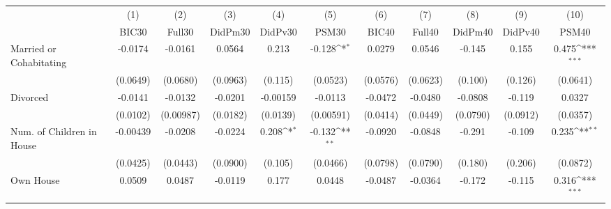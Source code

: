 {
\def\sym#1{\ifmmode^{#1}\else\(^{#1}\)\fi}
\begin{tabular}{l*{10}{c}}
\toprule
            &\multicolumn{1}{c}{(1)}&\multicolumn{1}{c}{(2)}&\multicolumn{1}{c}{(3)}&\multicolumn{1}{c}{(4)}&\multicolumn{1}{c}{(5)}&\multicolumn{1}{c}{(6)}&\multicolumn{1}{c}{(7)}&\multicolumn{1}{c}{(8)}&\multicolumn{1}{c}{(9)}&\multicolumn{1}{c}{(10)}\\
            &\multicolumn{1}{c}{BIC30}&\multicolumn{1}{c}{Full30}&\multicolumn{1}{c}{DidPm30}&\multicolumn{1}{c}{DidPv30}&\multicolumn{1}{c}{PSM30}&\multicolumn{1}{c}{BIC40}&\multicolumn{1}{c}{Full40}&\multicolumn{1}{c}{DidPm40}&\multicolumn{1}{c}{DidPv40}&\multicolumn{1}{c}{PSM40}\\
\midrule
Married or Cohabitating&     -0.0174         &     -0.0161         &      0.0564         &       0.213         &      -0.128\sym{*}  &      0.0279         &      0.0546         &      -0.145         &       0.155         &       0.475\sym{***}\\
            &    (0.0649)         &    (0.0680)         &    (0.0963)         &     (0.115)         &    (0.0523)         &    (0.0576)         &    (0.0623)         &     (0.100)         &     (0.126)         &    (0.0641)         \\
\addlinespace
Divorced    &     -0.0141         &     -0.0132         &     -0.0201         &    -0.00159         &     -0.0113         &     -0.0472         &     -0.0480         &     -0.0808         &      -0.119         &      0.0327         \\
            &    (0.0102)         &   (0.00987)         &    (0.0182)         &    (0.0139)         &   (0.00591)         &    (0.0414)         &    (0.0449)         &    (0.0790)         &    (0.0912)         &    (0.0357)         \\
\addlinespace
Num. of Children in House&    -0.00439         &     -0.0208         &     -0.0224         &       0.208\sym{*}  &      -0.132\sym{**} &     -0.0920         &     -0.0848         &      -0.291         &      -0.109         &       0.235\sym{**} \\
            &    (0.0425)         &    (0.0443)         &    (0.0900)         &     (0.105)         &    (0.0466)         &    (0.0798)         &    (0.0790)         &     (0.180)         &     (0.206)         &    (0.0872)         \\
\addlinespace
Own House   &      0.0509         &      0.0487         &     -0.0119         &       0.177         &      0.0448         &     -0.0487         &     -0.0364         &      -0.172         &      -0.115         &       0.316\sym{***}\\

\end{tabular}}

